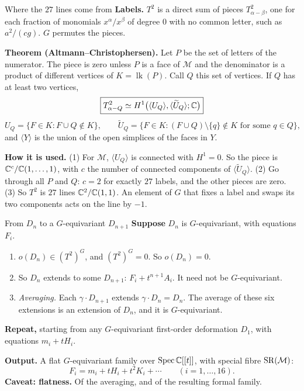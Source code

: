 \begin{frame}{Where the \(27\) lines come from}
\small
\textbf{Labels.} \(T^2\) is a direct sum of pieces \(T^2_{\alpha-\beta}\), one for each fraction of monomials \(x^\alpha/x^\beta\) of degree \(0\) with no common letter, such as \(a^2/(cg)\). \(G\) permutes the pieces.
\par
\textbf{Theorem (Altmann--Christophersen).} Let \(P\) be the set of letters of the numerator. The piece is zero unless \(P\) is a face of \(\mathcal M\) and the denominator is a product of different vertices of \(K=\operatorname{lk}(P)\). Call \(Q\) this set of vertices. If \(Q\) has at least two vertices,
\[
\boxed{T^2_{\alpha-Q}\simeq H^1\bigl(\langle U_Q\rangle,\langle\widetilde U_Q\rangle;\mathbb C\bigr)}
\]
\[
U_Q=\{F\in K: F\cup Q\notin K\},\qquad
\widetilde U_Q=\{F\in K:(F\cup Q)\setminus\{q\}\notin K\text{ for some }q\in Q\},
\]
and \(\langle Y\rangle\) is the union of the open simplices of the faces in \(Y\).
\par
\textbf{How it is used.} (1) For \(\mathcal M\), \(\langle U_Q\rangle\) is connected with \(H^1=0\). So the piece is \(\mathbb C^{c}/\mathbb C(1,\dots,1)\), with \(c\) the number of connected components of \(\langle\widetilde U_Q\rangle\). (2) Go through all \(P\) and \(Q\): \(c=2\) for exactly \(27\) labels, and the other pieces are zero. (3) So \(T^2\) is \(27\) lines \(\mathbb C^2/\mathbb C(1,1)\). An element of \(G\) that fixes a label and swaps its two components acts on the line by \(-1\).
\end{frame}

\begin{frame}{From \(D_n\) to a \(G\)-equivariant \(D_{n+1}\)}
\textbf{Suppose} \(D_n\) is \(G\)-equivariant, with equations \(F_i\).
\begin{enumerate}
\setlength{\itemsep}{3pt}
\item \(o(D_n)\in(T^2)^G\), and \((T^2)^G=0\). So \(o(D_n)=0\).
\item So \(D_n\) extends to some \(D_{n+1}\): \(F_i+t^{n+1}A_i\). It need not be \(G\)-equivariant.
\item \emph{Averaging.} Each \(\gamma\cdot D_{n+1}\) extends \(\gamma\cdot D_n=D_n\). The average of these six extensions is an extension of \(D_n\), and it is \(G\)-equivariant.
\end{enumerate}
\textbf{Repeat,} starting from any \(G\)-equivariant first-order deformation \(D_1\), with equations \(m_i+tH_i\).
\par\medskip
\textbf{Output.} A flat \(G\)-equivariant family over \(\operatorname{Spec}\mathbb C[[t]]\), with special fibre \(\operatorname{SR}(\mathcal M)\):
\[
\boxed{F_i=m_i+tH_i+t^2K_i+\cdots\qquad(i=1,\dots,16).}
\]
\textbf{Caveat: flatness.} Of the averaging, and of the resulting formal family.
\end{frame}

